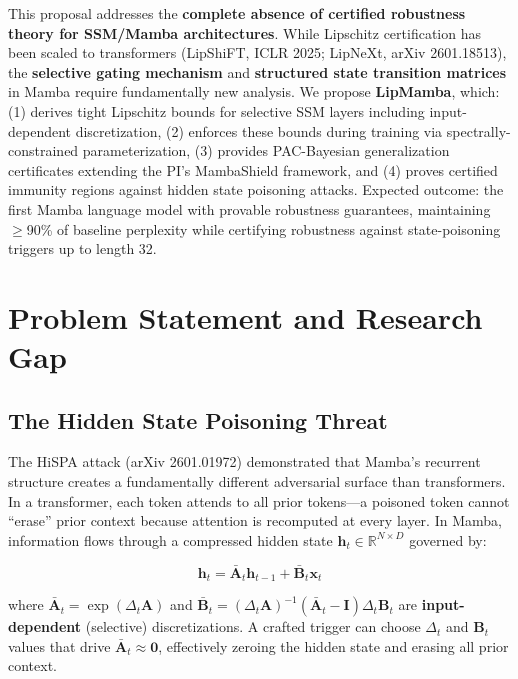 \documentclass[12pt,a4paper]{article}
\newcommand{\R}{\mathbb{R}}
\begin{document}
This proposal addresses the \textbf{complete absence of certified robustness theory for SSM/Mamba architectures}. While Lipschitz certification has been scaled to transformers (LipShiFT, ICLR 2025; LipNeXt, arXiv 2601.18513), the \textbf{selective gating mechanism} and \textbf{structured state transition matrices} in Mamba require fundamentally new analysis. We propose \textbf{LipMamba}, which: (1) derives tight Lipschitz bounds for selective SSM layers including input-dependent discretization, (2) enforces these bounds during training via spectrally-constrained parameterization, (3) provides PAC-Bayesian generalization certificates extending the PI's MambaShield framework, and (4) proves certified immunity regions against hidden state poisoning attacks. Expected outcome: the first Mamba language model with provable robustness guarantees, maintaining $\geq$90\% of baseline perplexity while certifying robustness against state-poisoning triggers up to length 32.

\section{Problem Statement and Research Gap}

\subsection{The Hidden State Poisoning Threat}

The HiSPA attack (arXiv 2601.01972) demonstrated that Mamba's recurrent structure creates a fundamentally different adversarial surface than transformers. In a transformer, each token attends to all prior tokens---a poisoned token cannot ``erase'' prior context because attention is recomputed at every layer. In Mamba, information flows through a compressed hidden state $\mathbf{h}_t \in \R^{N \times D}$ governed by:

\begin{equation}
    \mathbf{h}_t = \bar{\mathbf{A}}_t \mathbf{h}_{t-1} + \bar{\mathbf{B}}_t \mathbf{x}_t
\end{equation}

where $\bar{\mathbf{A}}_t = \exp(\Delta_t \mathbf{A})$ and $\bar{\mathbf{B}}_t = (\Delta_t \mathbf{A})^{-1}(\bar{\mathbf{A}}_t - \mathbf{I})\Delta_t \mathbf{B}_t$ are \textbf{input-dependent} (selective) discretizations. A crafted trigger can choose $\Delta_t$ and $\mathbf{B}_t$ values that drive $\bar{\mathbf{A}}_t \approx \mathbf{0}$, effectively zeroing the hidden state and erasing all prior context.
\end{document}
